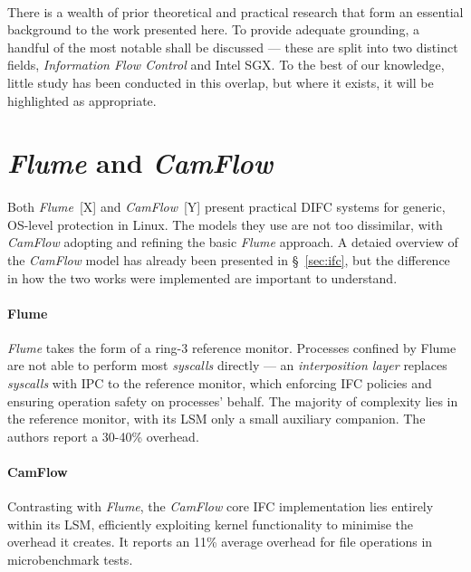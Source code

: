 \paragraph{} There is a wealth of prior theoretical and practical research that form an essential background to the work presented here. To provide adequate grounding, a handful of the most notable shall be discussed --- these are split into two distinct fields, \textit{Information Flow Control} and Intel SGX. To the best of our knowledge, little study has been conducted in this overlap, but where it exists, it will be highlighted as appropriate.


\section{\textit{Flume} and \textit{CamFlow}}
\paragraph{} Both \textit{Flume}~[X] and \textit{CamFlow}~[Y] present practical DIFC systems for generic, OS-level protection in Linux. The models they use are not too dissimilar, with \textit{CamFlow} adopting and refining the basic \textit{Flume} approach. A detaied overview of the \textit{CamFlow} model has already been presented in §~\ref{sec:ifc}, but the difference in how the two works were implemented are important to understand.

\paragraph{Flume} \textit{Flume} takes the form of a ring-3 reference monitor. Processes confined by Flume are not able to perform most \textit{syscalls} directly --- an \textit{interposition layer} replaces \textit{syscalls} with IPC to the reference monitor, which enforcing IFC policies and ensuring operation safety on processes' behalf. The majority of complexity lies in the reference monitor, with its LSM only a small auxiliary companion. The authors report a 30-40\% overhead.

\paragraph{CamFlow} Contrasting with \textit{Flume}, the \textit{CamFlow} core IFC implementation lies entirely within its LSM, efficiently exploiting kernel functionality to minimise the overhead it creates. It reports an 11\% average overhead for file operations in microbenchmark tests.


